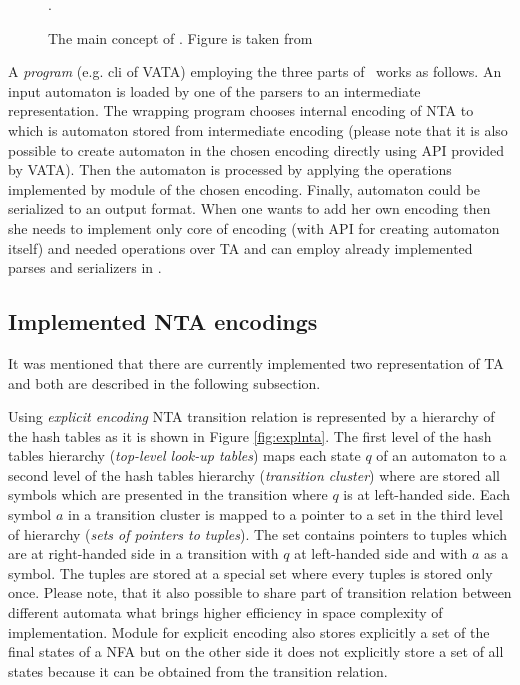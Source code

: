 \begin{figure}[bt]
\begin{center}

		\caption{The main concept of \vata. Figure is taken from \cite{libvata}}.
		\label{fig:vata}
\end{center}
\end{figure}

A \emph{program} (e.g. cli of VATA) employing the three parts of \vata\ works as follows.
An input automaton is loaded by one of the parsers to an intermediate representation.
The wrapping program chooses internal encoding of NTA to which is automaton stored from intermediate encoding (please note that it is also
possible to create automaton in the chosen encoding directly using API provided by VATA).
Then the automaton is processed by applying the operations implemented by module of the chosen encoding.
Finally, automaton could be serialized to an output format.
When one wants to add her own encoding then she needs to implement only core of encoding (with API for creating automaton itself)
and needed operations over TA and can employ already implemented parses and serializers in \vata.

\subsection{Implemented NTA encodings}

It was mentioned that there are currently implemented two representation of TA and both are described in the following subsection.

Using \emph{explicit encoding} NTA transition relation is represented by a hierarchy of the hash tables as it is shown in Figure \ref{fig:explnta}.
The first level of the hash tables hierarchy (\emph{top-level look-up tables}) maps each state $q$ of an automaton to 
a second level of the hash tables hierarchy (\emph{transition cluster}) where are stored all symbols which
are presented in the transition where $q$ is at left-handed side.
Each symbol $a$ in a transition cluster is mapped to a pointer to a set in the third level of hierarchy (\emph{sets of pointers to tuples}).
The set contains pointers to tuples which are at right-handed side in a transition with $q$ at left-handed side and with $a$ as a symbol.
The tuples are stored at a special set where every tuples is stored only once.
Please note, that it also possible to share part of transition relation between different automata what
brings higher efficiency in space complexity of implementation.
Module for explicit encoding also stores explicitly a set of the final states of a NFA but on
the other side it does not explicitly store a set of all states because it can be obtained from the transition relation.

